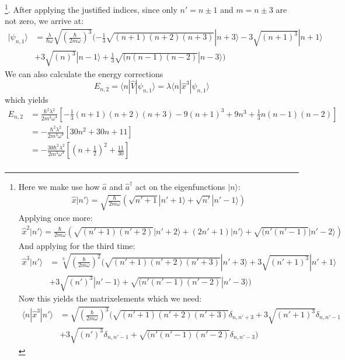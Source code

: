 \footnote{
    Here we make use how $\hat{a}$ and $\hat{a}^\dagger$ act 
    on the eigenfunctions $|n\rangle$:
\begin{align*}
    \hat{x}|n'\rangle = \sqrt{\frac{\hbar}{2m\omega}}
    \left ( \sqrt{n' + 1}|n'+1\rangle 
        + \sqrt{n'}|n' - 1 \rangle \right ) 
\end{align*}
Applying once more:
\begin{align*}
\hat{x}^2|n'\rangle = \frac{\hbar}{2m\omega}
\left ( \sqrt{(n' + 1)(n' + 2)}|n'+2\rangle 
            + (2n' + 1) |n' \rangle
            + \sqrt{(n'(n'-1)}|n' - 2 \rangle \right ) 
\end{align*}
And applying for the third time:
\begin{align*}
    \hat{x}^3|n'\rangle &= \sqrt[3]{\left (\frac{\hbar}{2m\omega}\right )^2}
( \sqrt{(n' + 1)(n' + 2)(n'+3)}|n'+3\rangle 
    + 3 \sqrt{(n'+1)^3}|n' +1 \rangle  \\
 &+ 3 \sqrt{(n')^3}|n' -1 \rangle   
            + \sqrt{(n'(n'-1)(n'-2)}|n' - 3 \rangle  ) 
\end{align*}
Now this yields the matrixelements which we need:
\begin{align}
    \langle n | \hat{x}^3 | n' \rangle &=  
    \sqrt{\left (\frac{\hbar}{2m\omega}\right)^3}
( \sqrt{(n' + 1)(n' + 2)(n'+3)}\delta_{n,n'+3} 
    + 3 \sqrt{(n'+1)^3}\delta_{n,n'-1}  \\
    &+ 3 \sqrt{(n')^3}\delta_{n,n'-1}   
    + \sqrt{(n'(n'-1)(n'-2)}\delta_{n,n'-3}  ) 
\end{align}

}. After applying the justified indices, since only $n'=n\pm 1$ and
$m = n \pm 3 $ are not zero, we arrive at:
\begin{equation}
\begin{aligned}
    |\psi_{n,1} \rangle &= \frac{\lambda}{\hbar \omega}
    \sqrt{\left(\frac{\hbar}{2m\omega}\right)^3}
    ( -\frac{1}{3}\sqrt{(n + 1)(n + 2)(n+3)}|n+3\rangle 
    - 3 \sqrt{(n+1)^3}|n +1 \rangle  \\
 &+ 3 \sqrt{(n)^3}|n -1 \rangle  
    +\frac{1}{3} \sqrt{(n(n-1)(n-2)}|n - 3 \rangle  ) 
\end{aligned}
\end{equation}
We can also calculate the energy corrections
\begin{equation}
    E_{n,2} = \langle n | \hat{V} | \psi_{n,1} \rangle 
    = \lambda \langle n | \hat{x}^3 | \psi_{n,1} \rangle 
\end{equation}
which yields
\begin{equation}
\begin{aligned}
    E_{n,2} &= \frac{\hbar^2 \lambda^2}{2 m^3 \omega ^4}
    \left[-\frac{1}{3}(n+1)(n+2)(n+3)
        -9(n+1)^3 + 9n^3 + \frac{1}{3}n(n-1)(n-2)
        \right ] \\
    &= -\frac{\hbar^2 \lambda^2}{2 m^3 \omega ^4}
    \left[ 30n^2+ 30n + 11 \right ]\\
    &= -\frac{30 \hbar^2 \lambda^2}{2 m^3 \omega ^4}
    \left[\left(n + \frac{1}{2} \right)^2 + \frac{11}{30} \right ]\\
\end{aligned}
\end{equation}
